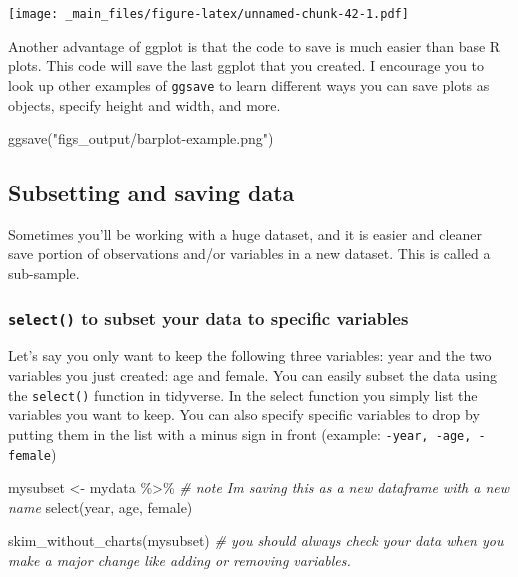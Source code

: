 \documentclass[
]{book}
\newenvironment{Shaded}{\begin{snugshade}}{\end{snugshade}}
\newcommand{\CommentTok}[1]{\textcolor[rgb]{0.56,0.35,0.01}{\textit{#1}}}
\newcommand{\FunctionTok}[1]{\textcolor[rgb]{0.00,0.00,0.00}{#1}}
\newcommand{\NormalTok}[1]{#1}
\newcommand{\OtherTok}[1]{\textcolor[rgb]{0.56,0.35,0.01}{#1}}
\newcommand{\SpecialCharTok}[1]{\textcolor[rgb]{0.00,0.00,0.00}{#1}}
\newcommand{\StringTok}[1]{\textcolor[rgb]{0.31,0.60,0.02}{#1}}
\begin{document}
\texttt{[image: \_main\_files/figure-latex/unnamed-chunk-42-1.pdf]}

Another advantage of ggplot is that the code to save is much easier than base R plots. This code will save the last ggplot that you created. I encourage you to look up other examples of \texttt{ggsave} to learn different ways you can save plots as objects, specify height and width, and more.

\begin{Shaded}
\begin{Highlighting}[]
\FunctionTok{ggsave}\NormalTok{(}\StringTok{"figs\_output/barplot{-}example.png"}\NormalTok{)}
\end{Highlighting}
\end{Shaded}

\hypertarget{subsetting-and-saving-data-1}{%
\subsection*{Subsetting and saving data}\label{subsetting-and-saving-data-1}}

Sometimes you'll be working with a huge dataset, and it is easier and cleaner save portion of observations and/or variables in a new dataset. This is called a sub-sample.

\hypertarget{select}{%
\subsubsection*{\texorpdfstring{\texttt{select()} to subset your data to specific variables}{select() to subset your data to specific variables}}\label{select}}

Let's say you only want to keep the following three variables: year and the two variables you just created: age and female. You can easily subset the data using the \texttt{select()} function in tidyverse. In the select function you simply list the variables you want to keep. You can also specify specific variables to drop by putting them in the list with a minus sign in front (example: \texttt{-year,\ -age,\ -female})

\begin{Shaded}
\begin{Highlighting}[]
\NormalTok{mysubset }\OtherTok{\textless{}{-}}\NormalTok{ mydata }\SpecialCharTok{\%\textgreater{}\%} \CommentTok{\# note I\textquotesingle{}m saving this as a new dataframe with a new name}
  \FunctionTok{select}\NormalTok{(year, age, female)}

\FunctionTok{skim\_without\_charts}\NormalTok{(mysubset) }\CommentTok{\# you should always check your data when you make a major change like adding or removing variables.}
\end{Highlighting}
\end{Shaded}
\end{document}
